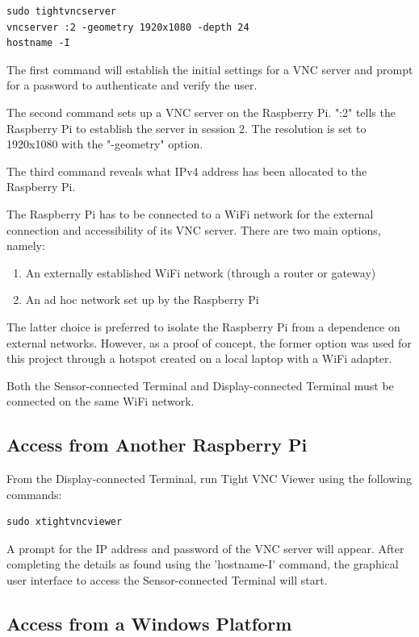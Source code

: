 \begin{lstlisting}
sudo tightvncserver
vncserver :2 -geometry 1920x1080 -depth 24 
hostname -I
\end{lstlisting}

The first command will establish the initial settings for a VNC server and prompt for a password to authenticate and verify the user. 

The second command sets up a VNC server on the Raspberry Pi. ":2" tells the Raspberry Pi to establish the server in session 2. The resolution is set to 1920x1080 with the "-geometry" option. 

The third command reveals what IPv4 address has been allocated to the Raspberry Pi. 

The Raspberry Pi has to be connected to a WiFi network for the external connection and accessibility of its VNC server. There are two main options, namely: 

\begin{enumerate}
	\item An externally established WiFi network (through a router or gateway)
	\item An ad hoc network set up by the Raspberry Pi
\end{enumerate}

The latter choice is preferred to isolate the Raspberry Pi from a dependence on external networks. However, as a proof of concept, the former option was used for this project through a hotspot created on a local laptop with a WiFi adapter. 

Both the Sensor-connected Terminal and Display-connected Terminal must be connected on the same WiFi network. 

\subsection{Access from Another Raspberry Pi}

From the Display-connected Terminal, run Tight VNC Viewer using the following commands: 

\begin{lstlisting}
sudo xtightvncviewer
\end{lstlisting}

A prompt for the IP address and password of the VNC server will appear. After completing the details as found using the 'hostname-I' command, the graphical user interface to access the Sensor-connected Terminal will start. 

\subsection{Access from a Windows Platform}

